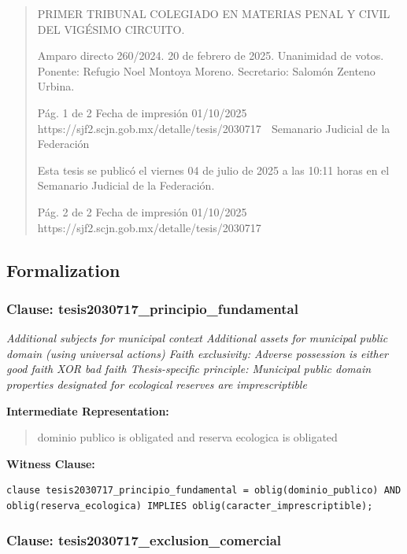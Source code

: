 \documentclass[11pt,a4paper]{article}
\begin{document}
\begin{quote}
PRIMER TRIBUNAL COLEGIADO EN MATERIAS PENAL Y CIVIL DEL VIGÉSIMO CIRCUITO.


Amparo directo 260/2024. 20 de febrero de 2025. Unanimidad de votos. Ponente: Refugio Noel
Montoya Moreno. Secretario: Salomón Zenteno Urbina.




                                             Pág. 1 de 2             Fecha de impresión 01/10/2025
 https://sjf2.scjn.gob.mx/detalle/tesis/2030717
                                                   Semanario Judicial de la Federación


Esta tesis se publicó el viernes 04 de julio de 2025 a las 10:11 horas en el Semanario Judicial de la
Federación.




                                              Pág. 2 de 2            Fecha de impresión 01/10/2025
  https://sjf2.scjn.gob.mx/detalle/tesis/2030717

\end{quote}

\subsection{Formalization}

\subsubsection{Clause: tesis2030717\_principio\_fundamental}

\textit{Additional subjects for municipal context Additional assets for municipal public domain (using universal actions) Faith exclusivity: Adverse possession is either good faith XOR bad faith Thesis-specific principle: Municipal public domain properties designated for ecological reserves are imprescriptible}

\textbf{Intermediate Representation:}

\begin{quote}
dominio publico is obligated and reserva ecologica is obligated
\end{quote}

\textbf{Witness Clause:}

\begin{lstlisting}[style=witnessstyle, language=Witness]
clause tesis2030717_principio_fundamental = oblig(dominio_publico) AND oblig(reserva_ecologica) IMPLIES oblig(caracter_imprescriptible);
\end{lstlisting}

\subsubsection{Clause: tesis2030717\_exclusion\_comercial}
\end{document}

